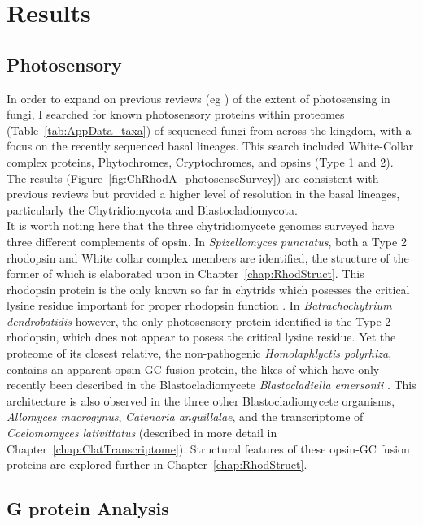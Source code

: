 \section{Results}
\subsection*{Photosensory}
In order to expand on previous reviews (eg \cite{Idnurm2010}) of the extent of photosensing in fungi, I searched for known photosensory proteins within proteomes (Table~\ref{tab:AppData_taxa}) of sequenced fungi from across the kingdom, with a focus on the recently sequenced basal lineages. This search included White-Collar complex proteins, Phytochromes, Cryptochromes, and opsins (Type 1 and 2). The results (Figure~\ref{fig:ChRhodA_photosenseSurvey}) are consistent with previous reviews but provided a higher level of resolution in the basal lineages, particularly the Chytridiomycota and Blastocladiomycota.\\
\indent It is worth noting here that the three chytridiomycete genomes surveyed have three different complements of opsin. In \textit{Spizellomyces punctatus}, both a Type 2 rhodopsin and White collar complex members are identified, the structure of the former of which is elaborated upon in Chapter~\ref{chap:RhodStruct}. This rhodopsin protein is the only known so far in chytrids which posesses the critical lysine residue important for proper rhodopsin function \cite{Smith2010}. In \textit{Batrachochytrium dendrobatidis} however, the only photosensory protein identified is the Type 2 rhodopsin, which does not appear to posess the critical lysine residue. Yet the proteome of its closest relative, the non-pathogenic \textit{Homolaphlyctis polyrhiza}, contains an apparent opsin-GC fusion protein, the likes of which have only recently been described in the Blastocladiomycete \textit{Blastocladiella emersonii} \cite{Avelar2014}. This architecture is also observed in the three other Blastocladiomycete organisms, \textit{Allomyces macrogynus}, \textit{Catenaria anguillalae}, and the transcriptome of \textit{Coelomomyces lativittatus} (described in more detail in Chapter~\ref{chap:ClatTranscriptome}). Structural features of these opsin-GC fusion proteins are explored further in Chapter~\ref{chap:RhodStruct}.\\
\subsection*{G protein Analysis}
